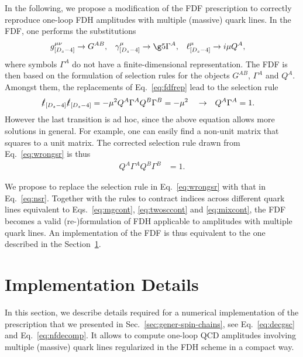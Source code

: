 In the following, we propose a modification of the FDF prescription to
correctly reproduce one-loop FDH amplitudes with multiple (massive)
quark lines. In the FDF, one performs the substitutions 
\begin{align}\label{eq:fdfrep}
  g^{\mu\nu}_{[D_s-4]} &\rightarrow G^{AB}, &
  \gamma^\mu_{[D_s-4]}&\rightarrow \g5 \Gamma^A,  &
  \ell^\mu_{[D_s-4]}&\rightarrow i\mu Q^A,
\end{align}
where symbols $\Gamma^A$ do not have a finite-dimensional representation.
The FDF is then
based on the formulation of selection rules for the objects $G^{AB}$,
$\Gamma^A$ and $Q^A$. Amongst them, the replacements of
Eq.~\eqref{eq:fdfrep} lead to the selection rule
\begin{align}\label{eq:wrongsr}
  \slashed{\ell}_{[D_s-4]}  \slashed{\ell}_{[D_s-4]} = - \mu^2
  Q^A\Gamma^AQ^B\Gamma^B &= -\mu^2 & &\rightarrow& Q^A\Gamma^A &=1.
\end{align}
However the last transition is ad hoc, since the above equation allows
more solutions in general. For example,
one can easily find a non-unit matrix that squares to a
unit matrix.
The corrected selection rule drawn from Eq.~\eqref{eq:wrongsr} is thus
\begin{align}\label{eq:nsr}
  Q^A\Gamma^AQ^B\Gamma^B &=1.
\end{align}

We propose to replace the selection rule in Eq.~\eqref{eq:wrongsr} with
that in Eq.~\eqref{eq:nsr}. Together with the rules to
contract indices across different quark lines equivalent to
Eqs.~\eqref{eq:mgcont}, \eqref{eq:twosccont} and \eqref{eq:mixcont}, the FDF becomes a valid (re-)formulation of
FDH applicable to amplitudes with multiple quark lines.
An implementation of the FDF is thus equivalent to the one described in the Section~\ref{sec:impl-deta}.


\section{Implementation Details}
\label{sec:impl-deta}
In this section, we describe details required for a numerical implementation of the
prescription that we presented in Sec.~\ref{sec:gener-spin-chains}, see
Eq.~\eqref{eq:decgsc} and Eq.~\eqref{eq:nfdecomp}. It allows to compute one-loop QCD amplitudes involving multiple (massive)
quark lines regularized
in the FDH scheme in a compact way.


